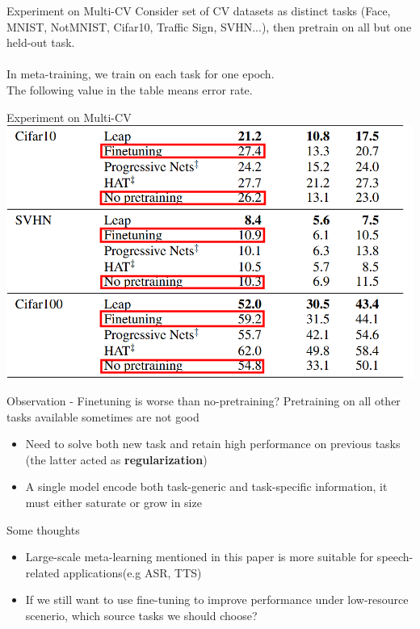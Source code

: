 \documentclass{beamer}
\begin{document}
\begin{frame}{Experiment on Multi-CV}
  Consider set of CV datasets as distinct tasks (Face, MNIST, NotMNIST, Cifar10, Traffic Sign, SVHN...), then pretrain on all but one held-out task.\\ 
  $\quad$\\ 
  In meta-training, we train on each task for one epoch.\\
  The following value in the table means error rate.
\end{frame}

\begin{frame}{Experiment on Multi-CV}
  \includegraphics[width=\textwidth]{fig/p1-MultiCV.png}
\end{frame}

\begin{frame}{Observation - Finetuning is worse than no-pretraining?}
  Pretraining on all other tasks available sometimes are not good

  \begin{itemize}
    \item Need to solve both new task and retain high performance on previous tasks (the latter acted as \textbf{regularization})
    \item A single model encode both task-generic and task-specific information,
      it must either saturate or grow in size
  \end{itemize}
\end{frame}

\begin{frame}{Some thoughts}
  \begin{itemize}
    \item Large-scale meta-learning mentioned in this paper is more suitable for speech-related applications(e.g ASR, TTS)
    \item If we still want to use fine-tuning to improve performance under low-resource scenerio, which source tasks we should choose? 
  \end{itemize}
\end{frame}
\end{document}
